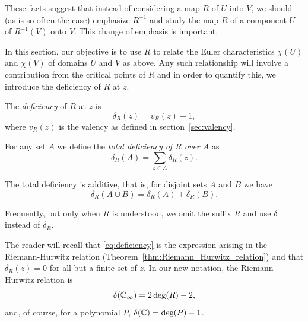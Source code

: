 These facts suggest that instead of considering a map $R$ of $U$ into $V$, we
should (as is so often the case) emphasize $R^{-1}$ and study the map $R$ of a
component $U$ of $R^{-1}(V)$ onto $V$. This change of emphasis is important.

In this section, our objective is to use $R$ to relate the Euler characteristics
$\chi(U)$ and $\chi(V)$ of domains $U$ and $V$ as above. Any such relationship
will involve a contribution from the critical points of $R$ and in order to
quantify this, we introduce the deficiency of $R$ at $z$.

\begin{definition}[Deficiency of $R$ at $z$]
    The \emph{deficiency} of $R$ at $z$ is
    \begin{equation}
        \label{eq:deficiency}
        \delta_R(z) = v_R(z) - 1,
    \end{equation}
    where $v_R(z)$ is the valency as defined in section~\ref{sec:valency}.
\end{definition}

\begin{definition}
    For any set $A$ we define the \emph{total deficiency of $R$ over $A$} as
    \begin{equation*}
        \delta_R(A) = \sum_{z \in A} \delta_R(z).
    \end{equation*}
\end{definition}

\begin{remark}
    The total deficiency is additive, that is, for disjoint sets $A$ and $B$ we
    have
    \begin{equation*}
        \delta_R(A \cup B) = \delta_R(A) + \delta_R(B).
    \end{equation*}
\end{remark}

Frequently, but only when $R$ is understood, we omit the suffix $R$ and use
$\delta$ instead of $\delta_R$.

The reader will recall that \eqref{eq:deficiency} is the expression arising in
the Riemann-Hurwitz relation (Theorem~\ref{thm:Riemann_Hurwitz_relation}) and
that $\delta_R(z) = 0$ for all but a finite set of $z$. In our new notation, the
Riemann-Hurwitz relation is
\begin{equation*}
    \delta(\mathbb{C}_\infty) = 2 \deg(R) - 2,
\end{equation*}
and, of course, for a polynomial $P$, $\delta(\mathbb{C}) = \deg(P) - 1$.


